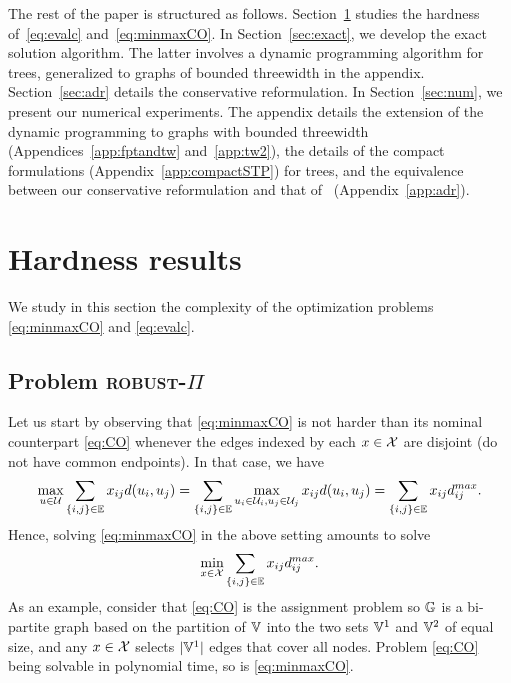 \documentclass[12pt]{article}
\newcommand{\blue}[1]{{\color{black}#1}}
\begin{document}
The rest of the paper is structured as follows. Section~\ref{sec:NPhard} studies the hardness of~\ref{eq:evalc} and~\ref{eq:minmaxCO}. In Section~\ref{sec:exact}, we develop the exact solution algorithm. %
The latter involves a dynamic programming algorithm for trees, generalized to graphs of bounded threewidth in the appendix. Section~\ref{sec:adr} details the conservative reformulation.
In Section~\ref{sec:num}, we present our numerical experiments. The appendix details the extension of the dynamic programming to graphs with bounded threewidth (Appendices~\ref{app:fptandtw} and~\ref{app:tw2}), the details of the compact formulations (Appendix~\ref{app:compactSTP}) for trees, and the equivalence between our conservative reformulation and that of~\cite{zhen2021robust} (Appendix~\ref{app:adr}).

\section{Hardness results}
\label{sec:NPhard}

We study in this section the complexity of the optimization problems \ref{eq:minmaxCO} and \ref{eq:evalc}. 

\subsection{Problem \textsc{robust}-$\Pi$}

\blue{Let us start by observing that \ref{eq:minmaxCO} is not harder than its nominal counterpart \ref{eq:CO} whenever the edges indexed by each $x\in\mathcal{X}$ are disjoint (do not have common endpoints). In that case, we have
$$
\max_{u\in\mathcal{U}}\sum_{\{i,j\}\in \mathbb{E}}x_{ij} d(u_i,u_j) = \sum_{\{i,j\}\in \mathbb{E}} \max_{u_i\in \mathcal{U}_i,u_j\in \mathcal{U}_j} x_{ij}d(u_i,u_j)=\sum_{\{i,j\}\in \mathbb{E}}x_{ij}d^{max}_{ij}.
$$
Hence, solving \ref{eq:minmaxCO} in the above setting amounts to solve
$$
 \min_{x\in \mathcal{X}}\sum_{\{i,j\}\in \mathbb{E}} x_{ij} d^{max}_{ij}.
$$
As an example, consider that \ref{eq:CO} is the assignment problem so $\mathbb{G}$ is a bi-partite graph based on the partition of $\mathbb{V}$ into the two sets $\mathbb{V}^1$ and $\mathbb{V}^2$ of equal size, and any $x\in\mathcal{X}$ selects $|\mathbb{V}^1|$ edges that cover all nodes. Problem \ref{eq:CO} being solvable in polynomial time, so is \ref{eq:minmaxCO}.}
\end{document}
